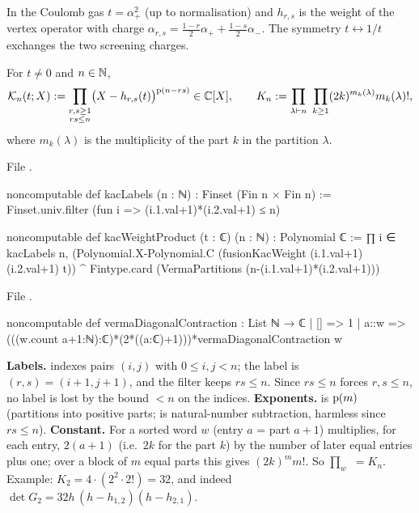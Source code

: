 \begin{physics}
In the Coulomb gas $t = \alpha_+^2$ (up to normalisation) and $h_{r,s}$ is the weight of the vertex
operator with charge $\alpha_{r,s} = \frac{1-r}2\alpha_++\frac{1-s}2\alpha_-$. The symmetry $t\leftrightarrow1/t$
exchanges the two screening charges.
\end{physics}

\begin{definition}\label{l06:def:kacproduct}
For $t\ne0$ and $n\in{\mathbb{N}}$,
\begin{equation*}
 \mathcal K_n(t;X) := \prod_{\substack{r,s\ge1\\ rs\le n}}\bigl(X-h_{r,s}(t)\bigr)^{\lsixpp(n-rs)}\in\C[X],
 \qquad
 K_n := \prod_{\lambda\vdash n}\ \prod_{k\ge1}(2k)^{m_k(\lambda)}m_k(\lambda)!,
\end{equation*}
where $m_k(\lambda)$ is the multiplicity of the part $k$ in the partition $\lambda$.
\end{definition}

File .
\begin{leancode}
noncomputable def kacLabels (n : ℕ) : Finset (Fin n × Fin n) :=
  Finset.univ.filter (fun i => (i.1.val+1)*(i.2.val+1) ≤ n)

noncomputable def kacWeightProduct (t : ℂ) (n : ℕ) : Polynomial ℂ :=
  ∏ i ∈ kacLabels n,
    (Polynomial.X-Polynomial.C (fusionKacWeight (i.1.val+1) (i.2.val+1) t)) ^
      Fintype.card (VermaPartitions (n-(i.1.val+1)*(i.2.val+1)))
\end{leancode}
File .
\begin{leancode}
noncomputable def vermaDiagonalContraction : List ℕ → ℂ
  | [] => 1
  | a::w => (((w.count a+1:ℕ):ℂ)*(2*((a:ℂ)+1)))*vermaDiagonalContraction w
\end{leancode}

\begin{dictionary}
\textbf{Labels.}  indexes pairs $(i,j)$ with $0\le i,j<n$; the label is
$(r,s) = (i+1,j+1)$, and the filter keeps $rs\le n$. Since $rs\le n$ forces $r,s\le n$, no label is lost by
the bound $<n$ on the indices. \textbf{Exponents.} \allowbreak{} is $\mathrm{p}(m)$
(partitions into positive parts;  is natural-number subtraction, harmless since $rs\le n$).
\textbf{Constant.} For a sorted word $w$ (entry $a$ = part $a+1$) 
multiplies, for each entry, $2(a+1)$ (i.e.\ $2k$ for the part $k$) by the number of later equal entries plus
one; over a block of $m$ equal parts this gives $(2k)^mm!$. So
$\prod_{w}$ $= K_n$. Example: $K_2 = 4\cdot(2^2\cdot2!) = 32$, and indeed
$\det G_2 = 32h\,(h-h_{1,2})(h-h_{2,1})$.
\end{dictionary}

